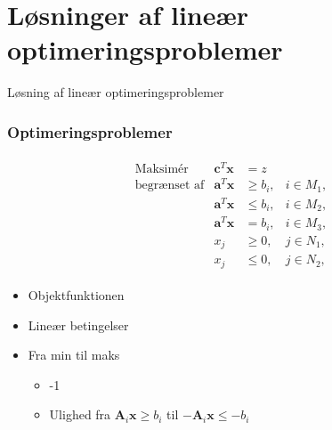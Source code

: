 \section{Løsninger af lineær optimeringsproblemer}
%
\begin{frame}
\centering
\Huge
Løsning af lineær optimeringsproblemer 
\end{frame}
%

\begin{frame}
\frametitle{Optimeringsproblemer}
\begin{align*}
\begin{array}{lrll}
\text{Maksimér}		&\textbf{c}^T\textbf{x}	& = z		&\\
\text{begrænset af}	&\textbf{a}^T\textbf{x}	&\geq b_i,	&i \in M_1,\\
					&\textbf{a}^T\textbf{x}	&\leq b_i,	&i \in M_2,\\
					&\textbf{a}^T\textbf{x}	& = b_i,	&i \in M_3,\\
					&x_j					&\geq 0,	&j \in N_1,\\
					&x_j					&\leq 0,	&j \in N_2,
\end{array}
\end{align*}
\begin{itemize}
\item Objektfunktionen
\item Lineær betingelser 
\item Fra min til maks 
\begin{itemize}
\item -1 
\item Ulighed fra $\textbf{A}_i \textbf{x} \geq b_i$ til $-\textbf{A}_i \textbf{x} \leq -b_i$
\end{itemize}
\end{itemize}
\end{frame}

